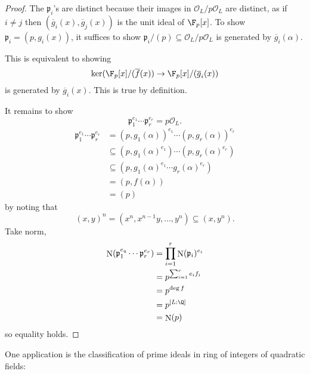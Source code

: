 \documentclass[a4paper]{article}
\renewcommand*{\O}{\mathcal{O}}
\DeclareMathOperator{\n}{N}
\newcommand*{\red}[1]{\overline{#1}}%
\begin{document}
\begin{proof}
  The \(\mathfrak p_i\)'s are distinct because their images in \(\O_L/p\O_L\) are distinct, as if \(i \neq j\) then \((\red g_i(x), \red g_j(x))\) is the unit ideal of \(\F_p[x]\). To show \(\mathfrak p_i = (p, g_i(x))\), it suffices to show \(\mathfrak p_i/(p) \subseteq \O_L/p\O_L\) is generated by \(\red g_i(\alpha)\).

  This is equivalent to showing
  \[
    \ker(\F_p[x]/(\red f(x)) \to \F_p[x]/(\red g_i(x))
  \]
  is generated by \(\red g_i(x)\). This is true by definition.

  It remains to show
  \[
    \mathfrak p_1^{e_1} \cdots \mathfrak p_r^{e_r} = p\O_L.
  \]
  \begin{align*}
    \mathfrak p_1^{e_1} \cdots \mathfrak p_r^{e_r}
    &= (p, g_1(\alpha))^{e_1} \cdots (p, g_r(\alpha))^{e_r} \\
    &\subseteq (p, g_1(\alpha)^{e_1}) \cdots (p, g_r(\alpha)^{e_r}) \\
    &\subseteq (p, g_1(\alpha)^{e_1} \cdots g_r(\alpha)^{e_r}) \\
    &= (p, f(\alpha)) \\
    &= (p)
  \end{align*}
  by noting that
  \[
    (x, y)^n = (x^n, x^{n - 1}y, \dots, y^n) \subseteq (x, y^n).
  \]
  Take norm,
  \begin{align*}
    \n(\mathfrak p_1^{e_q} \cdots \mathfrak p_r^{e_r})
    &= \prod_{i = 1}^r \n(\mathfrak p_i)^{e_i} \\
    &= p^{\sum_{i = 1}^re_if_i} \\
    &= p^{\deg f} \\
    &= p^{[L:\Q]} \\
    &= \n(p)
  \end{align*}
  so equality holds.
\end{proof}

One application is the classification of prime ideals in ring of integers of quadratic fields:
\end{document}
